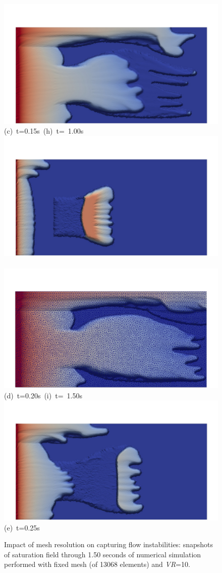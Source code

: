\begin{figure}[ht]
{{            \includegraphics[width=.45\textwidth]{./Pics1/Section4_4/5r_po_left_inlet_D1000b.pdf}}
      \vspace{-.1cm}\hbox{\hspace{2.cm}(c) t=0.15s \hspace{4cm} (h) t= 1.00s}\vspace{-.1cm}
      \hbox{\includegraphics[width=.45\textwidth]{./Pics1/Section4_4/5r_po_left_inlet_D200b.pdf} 
            \includegraphics[width=.45\textwidth]{./Pics1/Section4_4/5r_po_left_inlet_D1500b.pdf}}
      \vspace{-.1cm}\hbox{\hspace{2.cm}(d) t=0.20s \hspace{4cm} (i) t= 1.50s}\vspace{-.1cm}
      \hbox{\includegraphics[width=.45\textwidth]{./Pics1/Section4_4/5r_po_left_inlet_D250b.pdf}}
      \vspace{-.1cm}\hbox{\hspace{2.cm}(e) t=0.25s}\vspace{-.1cm}}
\caption{Impact of mesh resolution on capturing flow instabilities: snapshots of saturation field through 1.50 seconds of numerical simulation performed with fixed mesh (of 13068 elements) and {\it VR}=10.}
\label{fig:5regions_fixedmesh}
\end{figure}
\clearpage



